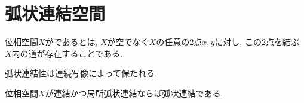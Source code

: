\documentclass[uplatex, dvipdfmx, a4paper, 12pt, class=jsbook, crop=false]{standalone}
\begin{document}
\section{弧状連結空間}
\label{sec:path-connected-spaces}

\newcommand{\loclabel}[1]{\label{LocalLabel-\thepart-\thechapter-\thesection:#1}}

\begin{definition}
	位相空間$ X $がであるとは,
	$ X $が空でなく$ X $の任意の2点$ x, y $に対し, この2点を結ぶ$ X $内の道が存在することである.　
\end{definition}

\begin{proposition}
	\loclabel{prop:Continuous maps preserve pathconnectedness}
	弧状連結性は連続写像によって保たれる.
\end{proposition}

\begin{proposition}
	\loclabel{prop:Ctd+LocPathCtd>PathCtd}
	位相空間$ X $が連結かつ局所弧状連結ならば弧状連結である.
\end{proposition}
\end{document}
